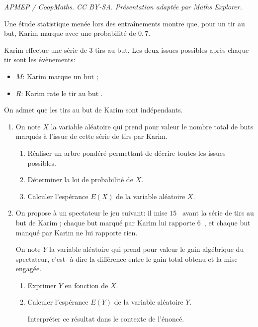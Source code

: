 \documentclass[10pt]{article}
\providecommand{\euro}{\texteuro}
\providecommand{\euro}{{\text{€}}}
\renewcommand{\euro}{\ifmmode\text{\texteuro}\else\texteuro\fi}
\begin{document}
\noindent\textit{APMEP / CoopMaths. CC BY-SA. Présentation adaptée par Maths Explorer.}\par\medskip
\medskip

Une étude statistique menée lors des entraînements montre que, pour un tir au but, Karim marque avec une probabilité de $0,7$.

Karim effectue une série de 3 tirs au but. Les deux issues possibles après chaque tir sont les évènements:

\setlength\parindent{1cm}
\begin{itemize}
\item[$\bullet~~$]$M$: \og Karim marque un but \fg{} ;
\item[$\bullet~~$]$R$: \og Karim rate le tir au but \fg.
\end{itemize}
\setlength\parindent{0cm}

On admet que les tirs au but de Karim sont indépendants.

\medskip

\begin{enumerate}
\item On note $X$ la variable aléatoire qui prend pour valeur le nombre total de buts marqués à l'issue de cette série de tirs par Karim.
	\begin{enumerate}
		\item Réaliser un arbre pondéré permettant de décrire toutes les issues possibles.	
		\item Déterminer la loi de probabilité de $X$.
		\item Calculer l'espérance $E(X)$ de la variable aléatoire $X$.
	\end{enumerate}
\item  On propose à un spectateur le jeu suivant: il mise $15$~\euro{} avant la série de tirs au but de Karim ; chaque but marqué par Karim lui rapporte $6$~\euro, et chaque but manqué par Karim ne lui rapporte rien.

On note $Y$ la variable aléatoire qui prend pour valeur le gain algébrique du spectateur, c'est- à-dire la différence entre le gain total obtenu et la mise engagée.
	\begin{enumerate}
		\item Exprimer $Y$ en fonction de $X$.
		\item Calculer l'espérance $E(Y)$ de la variable aléatoire $Y$. 

Interpréter ce résultat dans le contexte de l'énoncé.
	\end{enumerate}
\end{enumerate}
\end{document}
